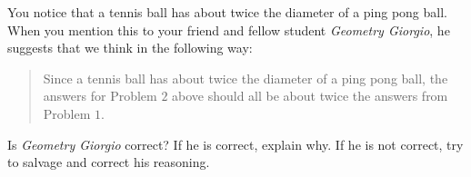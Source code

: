 \documentclass[handout,noauthor,nooutcomes,hints]{ximera}
\begin{document}
\begin{question}
  You notice that a tennis ball has about twice the diameter of a ping
  pong ball. When you mention this to your friend and fellow student
  \textit{Geometry Giorgio}, he suggests that we think in the
  following way:
\begin{quote}
  Since a tennis ball has about twice the diameter of a ping pong
  ball, the answers for Problem $2$ above should all be about twice the
  answers from Problem $1$.
\end{quote}
Is \textit{Geometry Giorgio} correct?  If he is correct, explain
why. If he is not correct, try to salvage and correct his reasoning.
\end{question}
\end{document}
